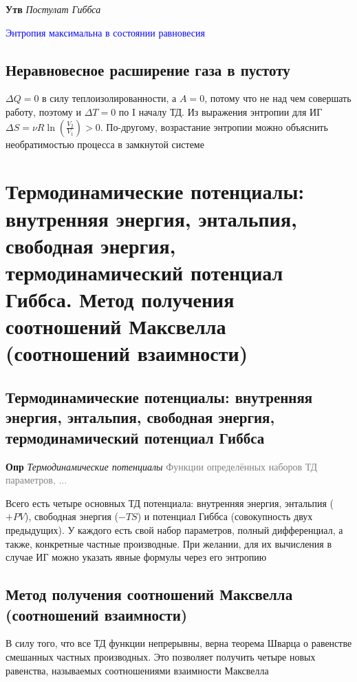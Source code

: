 \documentclass[a4paper, 14pt]{article}
\begin{document}
    \textbf{Утв} \textit{Постулат Гиббса}

    \textcolor{blue}{Энтропия максимальна в состоянии равновесия}

    \subsection{Неравновесное расширение газа в пустоту}

    $\Delta Q = 0$ в силу теплоизолированности, а $A = 0$, потому что не над чем совершать работу, поэтому и $\Delta
    T = 0$ по I началу ТД.
    Из выражения энтропии для ИГ $\Delta S = \nu R \ln \left(\frac{V_2}{V_1}\right) > 0$.
    По-другому, возрастание энтропии можно объяснить необратимостью процесса в замкнутой системе

    \section{Термодинамические потенциалы: внутренняя энергия, энтальпия, свободная энергия, термодинамический
    потенциал Гиббса.
    Метод получения соотношений Максвелла (соотношений взаимности)}

    \subsection{Термодинамические потенциалы: внутренняя энергия, энтальпия, свободная энергия, термодинамический
    потенциал Гиббса}

    \textbf{Опр} \textit{Термодинамические потенциалы} \textcolor{gray}{Функции определённых наборов ТД параметров, ...}

    Всего есть четыре основных ТД потенциала: внутренняя энергия, энтальпия ($+PV$), свободная энергия ($-TS$) и
    потенциал Гиббса (совокупность двух предыдущих).
    У каждого есть свой набор параметров, полный дифференциал, а также, конкретные частные производные.
    При желании, для их вычисления в случае ИГ можно указать явные формулы через его энтропию

    \subsection{Метод получения соотношений Максвелла (соотношений взаимности)}

    В силу того, что все ТД функции непрерывны, верна теорема Шварца о равенстве смешанных частных производных.
    Это позволяет получить четыре новых равенства, называемых соотношениями взаимности Максвелла
\end{document}
